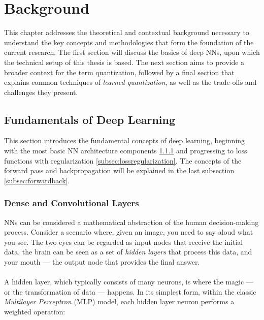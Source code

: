 \chapter{Background\label{cha:chapter2}}

This chapter addresses the theoretical and contextual background 
necessary to understand the key concepts and methodologies 
that form the foundation of the current research.
The first section will discuss the basics of deep NNs, 
upon which the technical setup of this thesis is based.
The next section aims to provide a broader context for the term quantization, 
followed by a final section that explains common techniques of \textit{learned quantization}, 
as well as the trade-offs and challenges they present. 


\section{Fundamentals of Deep Learning}
\label{sec:deeplearning}
This section introduces the fundamental concepts of deep learning, 
beginning with the most basic NN architecture components \ref{subsec:denseconvolutional} and progressing to loss functions with regularization \ref{subsec:lossregularization}. 
The concepts of the forward pass and backpropagation will be explained in the last subsection \ref{subsec:forwardback}.

\subsection{Dense and Convolutional Layers}
\label{subsec:denseconvolutional}
NNs can be considered a mathematical abstraction of the human decision-making process. 
Consider a scenario where, given an image, you need to say aloud what you see. 
The two eyes can be regarded as input nodes that receive the initial data, 
the brain can be seen as a set of \textit{hidden layers} that process this data, 
and your mouth — the output node that provides the final answer.
\\
\\
A hidden layer, which typically consists of many neurons, is where the magic
 — or the transformation of data — happens. In its simplest form, 
 within the classic \textit{Multilayer Perceptron} (MLP) model,
 each hidden layer neuron performs a weighted operation:

